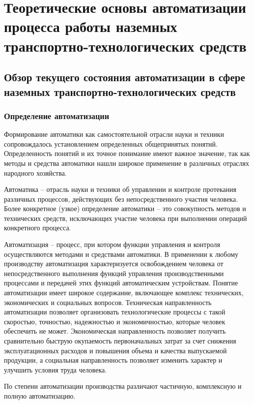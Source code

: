 \chapter{Теоретические основы автоматизации процесса работы наземных транспортно-технологических средств}\label{ch:ch1}

\section{Обзор текущего состояния автоматизации в сфере наземных транспортно-технологических средств}\label{sec:ch1/sec1}

\subsection{Определение автоматизации}\label{subsec:ch1/sec1/sub1}

Формирование автоматики как самостоятельной отрасли науки и техники сопровождалось установлением определенных общепринятых понятий. Определенность понятий и их точное понимание имеют важное значение, так как методы и средства автоматики нашли широкое применение в различных отраслях народного хозяйства.

Автоматика -- отрасль науки и техники об управлении и контроле протекания различных процессов, действующих без непосредственного участия человека. Более конкретное (узкое) определение автоматики -- это совокупность методов и технических средств, исключающих участие человека при выполнении операций конкретного процесса.

Автоматизация -- процесс, при котором функции управления и контроля осуществляются методами и средствами автоматики. В применении к любому производству автоматизация характеризуется освобождением человека от непосредственного выполнения функций управления производственными процессами и передачей этих функций автоматическим устройствам. Понятие автоматизации имеет широкое содержание, включающее комплекс технических, экономических и социальных вопросов. Техническая направленность автоматизации позволяет организовать технологические процессы с такой скоростью, точностью, надежностью и экономичностью, которые человек обеспечить не может. Экономическая направленность позволяет получить сравнительно быструю окупаемость первоначальных затрат за счет снижения эксплуатационных расходов и повышения объема и качества выпускаемой продукции, а социальная направленность позволяет изменить характер и улучшить условия труда человека.

По степени автоматизации производства различают частичную, комплексную и полную автоматизацию.


